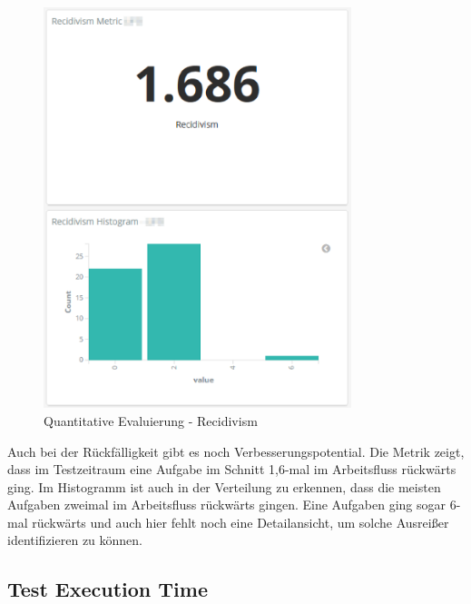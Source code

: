 \begin{savenotes}
    \begin{figure}[H]
      \centering
      \includegraphics[width=0.8\textwidth]{img/eval-recidivism.png}
      \caption{Quantitative Evaluierung {-} Recidivism}\label{fig:eval_recidivism}
    \end{figure}
\end{savenotes}

Auch bei der Rückfälligkeit gibt es noch Verbesserungspotential.
Die Metrik zeigt, dass im Testzeitraum eine Aufgabe im Schnitt 1,6-mal im Arbeitsfluss rückwärts ging.
Im Histogramm ist auch in der Verteilung zu erkennen, dass die meisten Aufgaben zweimal im Arbeitsfluss rückwärts gingen.
Eine Aufgaben ging sogar 6-mal rückwärts und auch hier fehlt noch eine Detailansicht, um solche Ausreißer identifizieren zu können.

\clearpage
\subsection*{Test Execution Time}

